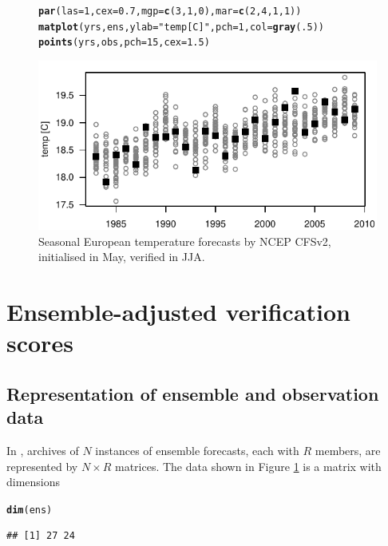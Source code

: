 \documentclass[article]{jss}\usepackage{graphicx, color}
\makeatletter
\def\maxwidth{ %
  \ifdim\Gin@nat@width>\linewidth
    \linewidth
  \else
    \Gin@nat@width
  \fi
}
\newcommand{\hlfunctioncall}[1]{\textcolor[rgb]{0,0.501960784313725,0.752941176470588}{\textbf{#1}}}%
\newcommand{\hlstring}[1]{\textcolor[rgb]{0.650980392156863,0.52156862745098,0}{#1}}%
\newenvironment{kframe}{%
 \def\at@end@of@kframe{}%
 \ifinner\ifhmode%
  \def\at@end@of@kframe{\end{minipage}}%
  \begin{minipage}{\columnwidth}%
 \fi\fi%
 \def\FrameCommand##1{\hskip\@totalleftmargin \hskip-\fboxsep
 \colorbox{shadecolor}{##1}\hskip-\fboxsep
     \hskip-\linewidth \hskip-\@totalleftmargin \hskip\columnwidth}%
 \MakeFramed {\advance\hsize-\width
   \@totalleftmargin\z@ \linewidth\hsize
   \@setminipage}}%
 {\par\unskip\endMakeFramed%
 \at@end@of@kframe}
\newenvironment{knitrout}{}{} %
\makeatother
\begin{document}
\begin{figure}
\begin{center}
%
\begin{knitrout}
\color{fgcolor}\begin{kframe}
\begin{alltt}
\hlfunctioncall{par}(las=1, cex=0.7, mgp=\hlfunctioncall{c}(3, 1, 0), mar=\hlfunctioncall{c}(2,4,1,1))
\hlfunctioncall{matplot}(yrs, ens, ylab=\hlstring{"temp [C]"}, pch=1, col=\hlfunctioncall{gray}(.5))
\hlfunctioncall{points}(yrs, obs, pch=15, cex=1.5)
\end{alltt}
\end{kframe}
\includegraphics[width=\maxwidth]{figure/gfs-plot} 

\end{knitrout}

%
\end{center}
\caption{Seasonal European temperature forecasts by NCEP CFSv2, initialised in May, verified in JJA.}
\label{gfs-plot}
\end{figure}


\section{Ensemble-adjusted verification scores}

\subsection{Representation of ensemble and observation data}

In , archives of $N$ instances of ensemble forecasts, each with $R$ members, are represented by $N\times R$ matrices.
The data shown in Figure \ref{gfs-plot} is a matrix with dimensions

\begin{knitrout}
\color{fgcolor}\begin{kframe}
\begin{alltt}
\hlfunctioncall{dim}(ens)
\end{alltt}
\begin{verbatim}
## [1] 27 24
\end{verbatim}
\end{kframe}
\end{knitrout}
\end{document}
